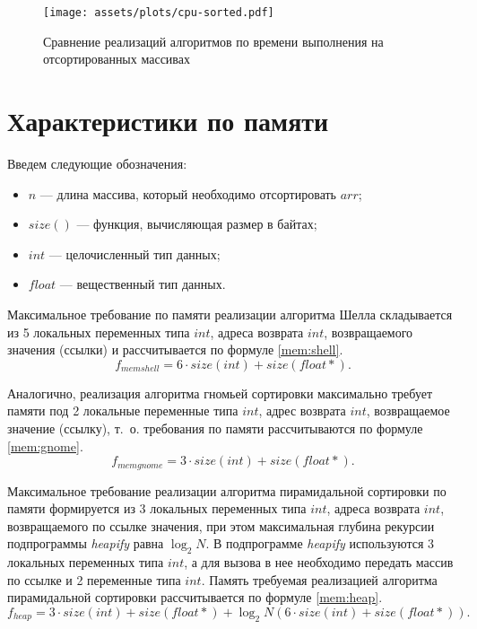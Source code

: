 \newpage

\begin{figure}[H]
	\centering
	\texttt{[image: assets/plots/cpu-sorted.pdf]}
	\caption{Сравнение реализаций алгоритмов по времени выполнения на отсортированных массивах}
	\label{pic:sorted}
\end{figure}

\clearpage


\section{Характеристики по памяти}

Введем следующие обозначения:
\begin{itemize}
	\item $n$ --- длина массива, который необходимо отсортировать $arr$;
	\item $size()$ --- функция, вычисляющая размер в байтах;
	\item $int$ --- целочисленный тип данных;
	\item $float$ --- вещественный тип данных.
\end{itemize}

Максимальное требование по памяти реализации алгоритма Шелла складывается из 5 локальных переменных типа $int$, адреса возврата $int$, возвращаемого значения (ссылки) и рассчитывается по формуле \eqref{mem:shell}.
\begin{equation}
	\label{mem:shell}
	f_{memshell} = 6 \cdot size(int) + size(float *).
\end{equation}

Аналогично, реализация алгоритма гномьей сортировки максимально требует памяти под 2 локальные переменные типа $int$, адрес возврата $int$, возвращаемое значение (ссылку), т.~о. требования по памяти рассчитываются по формуле \eqref{mem:gnome}.
\begin{equation}
	\label{mem:gnome}
	f_{memgnome} = 3 \cdot size(int) + size(float *).
\end{equation}

Максимальное требование реализации алгоритма пирамидальной сортировки по памяти формируется из 3 локальных переменных типа $int$, адреса возврата $int$, возвращаемого по ссылке значения, при этом максимальная глубина рекурсии подпрограммы \textit{heapify} равна $\log_2 N$. 
В подпрограмме \textit{heapify} используются 3 локальных переменных типа $int$, а для вызова в нее необходимо передать массив по ссылке и 2 переменные типа $int$. 
Память требуемая реализацией алгоритма пирамидальной сортировки рассчитывается по формуле \eqref{mem:heap}.
\begin{equation}
	\label{mem:heap}
	f_{heap} = 3 \cdot size(int) + size(float *) + \log_2 N (6 \cdot size(int) + size(float *)).
\end{equation}

